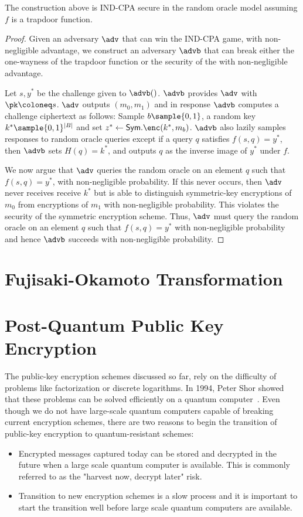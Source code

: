 \documentclass[12pt]{tufte-book}
\begin{document}
\begin{theorem}
    The construction above is IND-CPA secure in the random oracle model assuming $f$ is a trapdoor function.
\end{theorem}
\begin{proof}
    Given an adversary $\adv$ that can win the IND-CPA game, with non-negligible advantage, we construct an adversary $\advb$ that can break either the one-wayness of the trapdoor function or the security of the with non-negligible advantage.

    Let $s, y^*$ be the challenge given to $\advb()$. $\advb$ provides $\adv$ with $\pk \coloneq s$. $\adv$ outputs $(m_0, m_1)$ and in response $\advb$ computes a challenge ciphertext as follows: Sample $b \sample \{0,1\}$, a random key $k^* \sample \{0,1\}^{|B|}$ and set $z^* \gets \mathsf{Sym}.\enc(k^*, m_b)$. $\advb$ also lazily samples responses to random oracle queries except if a query $q$ satisfies $f(s, q) = y^*$, then $\advb$ sets $H(q) = k^*$, and outputs $q$ as the inverse image of $y^*$ under $f$.

    We now argue that $\adv$ queries the random oracle on an element $q$ such that $f(s, q) = y^*$, with non-negligible probability. If this never occurs, then $\adv$ never receives receive $k^*$ but is able to distinguish symmetric-key encryptions of $m_0$ from encryptions of $m_1$ with non-negligible probability. This violates the security of the symmetric encryption scheme. Thus, $\adv$ must query the random oracle on an element $q$ such that $f(s, q) = y^*$ with non-negligible probability and hence $\advb$ succeeds with non-negligible probability.
\end{proof}
 \section{Fujisaki-Okamoto Transformation}

\section{Post-Quantum Public Key Encryption}
The public-key encryption schemes discussed so far, rely on the difficulty of problems like factorization or discrete logarithms. In 1994, Peter Shor showed that these problems can be solved efficiently on a quantum computer~\cite{FOCS:Shor94}. Even though we do not have large-scale quantum computers capable of breaking current encryption schemes, there are two reasons to begin the transition of public-key encryption to quantum-resistant schemes:
\begin{itemize}
    \item Encrypted messages captured today can be stored and decrypted in the future when a large scale quantum computer is available. This is commonly referred to as the "harvest now, decrypt later" risk.
    \item Transition to new encryption schemes is a slow process and it is important to start the transition well before large scale quantum computers are available.
\end{itemize}
\end{document}

